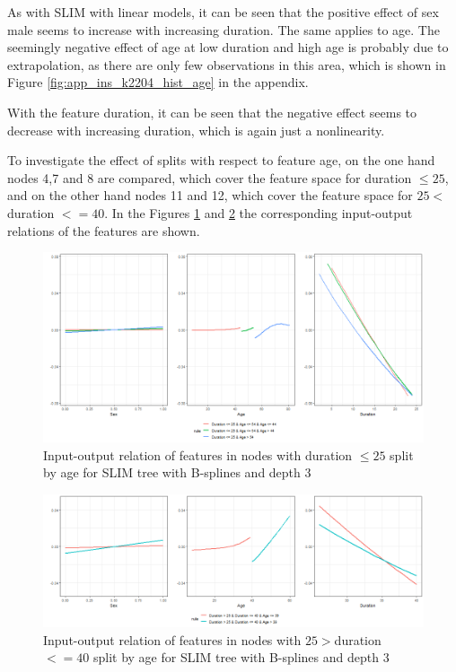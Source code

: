 As with SLIM with linear models, it can be seen that the positive effect of sex male seems to increase with increasing duration. The same applies to age. The seemingly negative effect of age at low duration and high age is probably due to extrapolation, as there are only
few observations in this area, which is shown in Figure \ref{fig:app_ins_k2204_hist_age} in the appendix.



With the feature duration, it can be seen that the negative effect seems to decrease with increasing duration, which is again just a nonlinearity.

To investigate the effect of splits with respect to feature age, on the one hand nodes 4,7 and 8 are compared, which cover the feature space for duration $\leq 25$, and on the other hand nodes 11 and 12, which cover the feature space for $25 < $duration $<= 40$. In the Figures \ref{fig:ins_k2204_effects_age_low_duration} and \ref{fig:ins_k2204_effects_age_medium_duration} the corresponding input-output relations of the features are shown.

\begin{figure}[!htb]
    \centering    
    \includegraphics[width = 16cm]{Figures/insurance_use_case/k2204_BPV/effects_age_low_duration.png}
    \caption{Input-output relation of features in nodes with duration $\leq 25$ split by age for SLIM tree with B-splines and depth 3}
    \label{fig:ins_k2204_effects_age_low_duration}
\end{figure}

\begin{figure}[!htb]
    \centering    
    \includegraphics[width = 16cm]{Figures/insurance_use_case/k2204_BPV/effects_age_medium_duration.png}
    \caption{Input-output relation of features in nodes with $25 > $duration $<= 40$ split by age for SLIM tree with B-splines and depth 3}
    \label{fig:ins_k2204_effects_age_medium_duration}
\end{figure}

